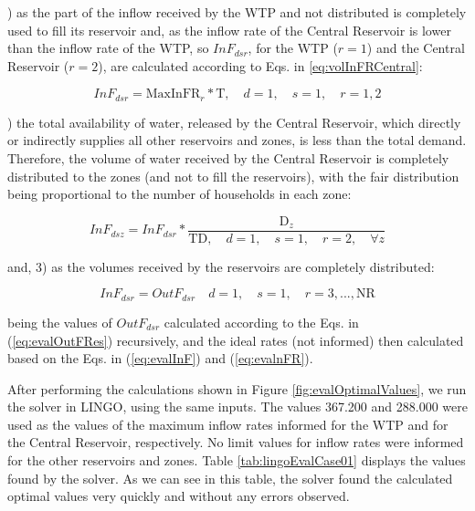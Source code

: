 \documentclass{singlecol}
\theoremstyle{TH}{
\newtheorem{lemma}{Lemma}
\newtheorem{theorem}[lemma]{Theorem}
\newtheorem{corrolary}[lemma]{Corrolary}
\newtheorem{conjecture}[lemma]{Conjecture}
\newtheorem{proposition}[lemma]{Proposition}
\newtheorem{claim}[lemma]{Claim}
\newtheorem{stheorem}[lemma]{Wrong Theorem}
\newtheorem{algorithm}{Algorithm}
}
\theoremstyle{THrm}{
\newtheorem{definition}{Definition}[section]
\newtheorem{question}{Question}[section]
\newtheorem{remark}{Remark}
\newtheorem{scheme}{Scheme}
}
\theoremstyle{THhit}{
\newtheorem{case}{Case}[section]
}
\begin{document}
) as the part of the inflow received by the WTP and not distributed is completely used to fill its reservoir and, as the inflow rate of the Central Reservoir is lower than the inflow rate of the WTP, so $InF_{dsr}$, for the WTP ($r=1$) and the Central Reservoir  ($r=2$), are calculated according to Eqs. in \ref{eq:volInFRCentral}: 

\begin{equation}
	InF_{dsr} = \mathrm{MaxInFR}_r * \mathrm{T}, \quad d = 1, \quad s = 1, \quad r = 1,2
	\label{eq:volInFRCentral}
\end{equation}

) the total availability of water, released by the Central Reservoir, which directly or indirectly supplies all other reservoirs and zones, is less than the total demand. Therefore, the volume of water received by the Central Reservoir is completely distributed to the zones (and not to fill the reservoirs), with the fair distribution being proportional to the number of households in each zone: 

\begin{equation}
	InF_{dsz} = InF_{dsr} * \dfrac{\mathrm{D}_z}{ \mathrm{TD},
	\quad d = 1, \quad s = 1, \quad r = 2, \quad \forall z}  
\end{equation}

\noindent and, 3) as the volumes received by the reservoirs are completely distributed: 

\begin{equation}
	InF_{dsr} = OutF_{dsr} \quad d = 1, \quad s = 1, \quad r=3, ..., \mathrm{NR}
\end{equation}

\noindent being the values of $OutF_{dsr}$ calculated according to the Eqs. in (\ref{eq:evalOutFRes}) recursively, and the ideal rates (not informed) then calculated based on the Eqs. in (\ref{eq:evalInF}) and (\ref{eq:evalnFR}).

After performing the calculations shown in Figure \ref{fig:evalOptimalValues}, we run the solver in LINGO, using the same inputs. The values 367.200 and 288.000 were used as the values of the maximum inflow rates informed for the WTP and for the Central Reservoir, respectively. No limit values for inflow rates were informed for the other reservoirs and zones. Table \ref{tab:lingoEvalCase01} displays the values found by the solver. As we can see in this table, the solver found the calculated optimal values very quickly and without any errors observed. 
\end{document}
